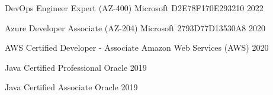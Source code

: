 

\begin{cvhonors}
	
  
	
  \cvhonor
	{DevOps Engineer Expert (AZ-400)} %
	{Microsoft} %
	{D2E78F170E293210} %
	{2022} %
	
  \cvhonor
	{Azure Developer Associate (AZ-204)} %
	{Microsoft} %
	{2793D77D13530A8} %
	{2020} %
	
  \cvhonor
	{AWS Certified Developer - Associate} %
	{Amazon Web Services (AWS)} %
	{} %
	{2020} %
	
  \cvhonor
	{Java Certified Professional} %
	{Oracle} %
	{} %
	{2019} %

  \cvhonor
    {Java Certified Associate} %
    {Oracle} %
    {} %
    {2019} %

\end{cvhonors}

